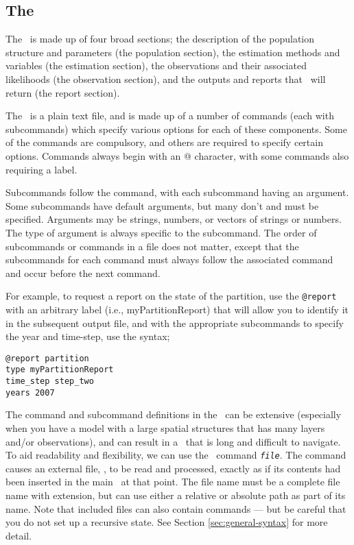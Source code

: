 \subsection{The \config\label{sec:config-files}}

The \config\ is made up of four broad sections; the description of the population structure and parameters (the population section), the estimation methods and variables (the estimation section), the observations and their associated likelihoods (the observation section), and the outputs and reports that \SPM\ will return (the report section). 

The \config\ is a plain text file, and is made up of a number of commands (each with subcommands) which specify various options for each of these components. Some of the commands are compulsory, and others are required to specify certain options.  Commands always begin with an @ character, with some commands also requiring a label. 

Subcommands follow the command, with each subcommand having an argument. Some subcommands have default arguments, but many don't and must be specified. Arguments may be strings, numbers, or vectors of strings or numbers. The type of argument is always specific to the subcommand. The order of subcommands or commands in a file does not matter, except that the subcommands for each command must always follow the associated command and occur before the next command. 

For example, to request a report on the state of the partition, use the \texttt{@report} with an arbitrary label (i.e., myPartitionReport) that will allow you to identify it in the subsequent output file, and with the appropriate subcommands to specify the year and time-step, use the syntax; 
{\small{\begin{verbatim}
@report partition
type myPartitionReport
time_step step_two
years 2007
\end{verbatim}}}

The command and subcommand definitions in the \config\ can be extensive (especially when you have a model with a large spatial structures that has many layers and/or observations), and can result in a \config\ that is long and difficult to navigate. To aid readability and flexibility, we can use the \config\ command  \texttt{\emph{file}}. The command causes an external file, , to be read and processed, exactly as if its contents had been inserted in the main \config\ at that point. The file name must be a complete file name with extension, but can use either a relative or absolute path as part of its name. Note that included files can also contain  commands --- but be careful that you do not set up a recursive state. See Section \ref{sec:general-syntax} for more detail.

